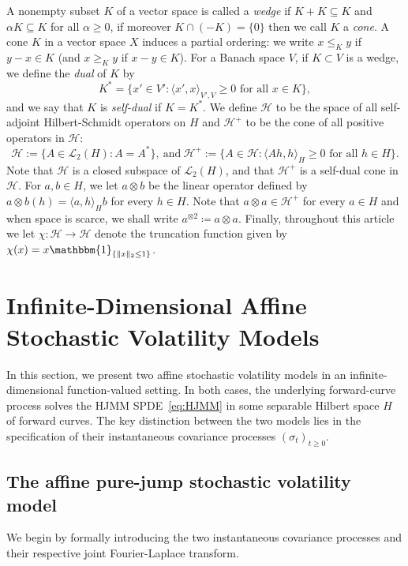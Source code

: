 \documentclass[10pt,a4paper,reqno]{amsart}
\numberwithin{equation}{section}
\theoremstyle{plain}
\theoremstyle{definition}
\theoremstyle{example}
\newcommand{\cH}{\mathcal{H}}
\newcommand{\cL}{\mathcal{L}}
\newcommand{\df}{\coloneqq}
\newcommand{\cHplus}{\cH^{+}}
\begin{document}
A nonempty subset $K$ of a vector space is called a \emph{wedge} if $K+K\subseteq K$ and $\alpha K \subseteq K$
for all $\alpha \geq 0$, if moreover $K\cap (-K) = \{ 0\}$ then we call $K$ a \emph{cone}. A cone $K$ in a vector space $X$ induces a partial ordering: we 
write $x \leq_{K} y$ if $y-x\in K$ (and $x\geq_K y$ if $x-y\in K$). For a Banach space $V$, if 
$K\subset V$ is a wedge, 
we define the \emph{dual} of $K$ by
\begin{equation}
K^* = \{ x' \in V' \colon \langle x', x\rangle_{V', V} \geq 0 \text{ for all } x\in K \},
\end{equation}
and we say that $K$ is \emph{self-dual} if $K=K^*$. 
We define $\cH$ to be the space of all self-adjoint Hilbert-Schmidt operators on $H$ and 
$\cH^+$ to be the cone of all positive operators in $\cH$:
\begin{equation*}
 \cH := \{ A \in \cL_{2}(H) \colon A = A^* \}, \ \text{and}\ 
 \cH^{+} := \{ A \in \cH \colon \langle Ah, h\rangle_H \geq 0 \text{ for all } h\in H \}. 
\end{equation*}
Note that $\cH$ is a closed subspace of $\cL_{2}(H)$, and that $\cH^{+}$ is a self-dual 
cone in $\cH$.
For
$a,b\in H$, we let $a\otimes b$ be the linear operator defined by
$a\otimes b (h)=\langle a, h\rangle_{H} b$ for every $h\in H$. Note that $a\otimes a\in\cHplus$
for every $a\in H$ and when space is scarce, we shall write $a^{\otimes 2}\df a\otimes a$. Finally, throughout this article we let $\chi\colon \cH\rightarrow \cH$
denote the truncation function given by $\chi(x) = x\mathbbm{1}_{\{\| x \|_2 \leq 1\}}$.


\section{Infinite-Dimensional Affine Stochastic Volatility Models} \label{sec:hjmm}

In this section, we present two affine stochastic volatility models in an infinite-dimensional function-valued setting. In both cases, the underlying forward-curve process solves the HJMM SPDE~\eqref{eq:HJMM} in some separable Hilbert space $H$ of forward curves. The key distinction between the two models lies in the specification of their instantaneous covariance processes $(\sigma_t)_{t\geq 0}$.  

\subsection{The affine pure-jump stochastic volatility model}\label{sec:OU-jumps}
We begin by formally introducing the two instantaneous covariance processes and their respective joint Fourier-Laplace transform.
\end{document}
